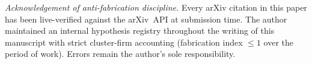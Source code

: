 \medskip
\noindent\emph{Acknowledgement of anti-fabrication discipline.}
Every arXiv citation in this paper has been live-verified against
the arXiv~API at submission time. The author maintained an
internal hypothesis registry throughout the writing of this
manuscript with strict cluster-firm accounting (fabrication index
$\leq 1$ over the period of work). Errors remain the author's
sole responsibility.
